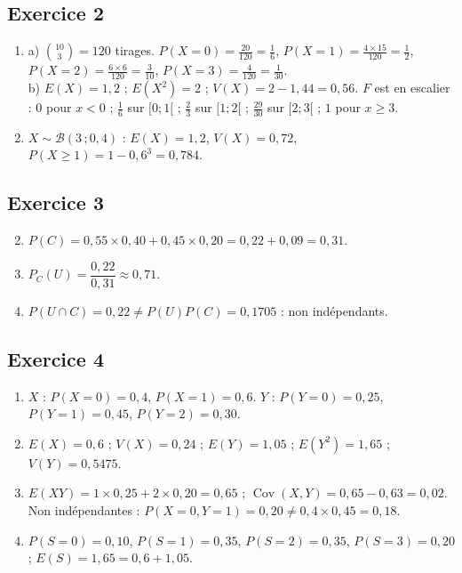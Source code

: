\documentclass[11pt,a4paper]{article}
\begin{document}
\subsection*{Exercice 2}
\begin{enumerate}
  \item a) $\binom{10}{3} = 120$ tirages.
  $P(X=0) = \frac{20}{120} = \frac16$, $P(X=1) = \frac{4\times15}{120} = \frac12$,
  $P(X=2) = \frac{6\times6}{120} = \frac{3}{10}$, $P(X=3) = \frac{4}{120} = \frac1{30}$.\\
  b) $E(X) = 1{,}2$ ; $E(X^2) = 2$ ; $V(X) = 2 - 1{,}44 = 0{,}56$.
  $F$ est en escalier : $0$ pour $x<0$ ; $\frac16$ sur $[0;1[$ ; $\frac23$ sur $[1;2[$ ; $\frac{29}{30}$ sur $[2;3[$ ; $1$ pour $x\geqslant3$.
  \item $X \sim \mathcal{B}(3\,;0{,}4)$ : $E(X) = 1{,}2$, $V(X) = 0{,}72$,
  $P(X\geqslant1) = 1 - 0{,}6^3 = 0{,}784$.
\end{enumerate}

\subsection*{Exercice 3}
\begin{enumerate}
  \setcounter{enumi}{1}
  \item $P(C) = 0{,}55\times0{,}40 + 0{,}45\times0{,}20 = 0{,}22 + 0{,}09 = 0{,}31$.
  \item $P_C(U) = \dfrac{0{,}22}{0{,}31} \approx 0{,}71$.
  \item $P(U\cap C) = 0{,}22 \neq P(U)P(C) = 0{,}1705$ : non indépendants.
\end{enumerate}

\subsection*{Exercice 4}
\begin{enumerate}
  \item $X$ : $P(X=0) = 0{,}4$, $P(X=1) = 0{,}6$. \quad
  $Y$ : $P(Y=0) = 0{,}25$, $P(Y=1) = 0{,}45$, $P(Y=2) = 0{,}30$.
  \item $E(X) = 0{,}6$ ; $V(X) = 0{,}24$ ; $E(Y) = 1{,}05$ ; $E(Y^2) = 1{,}65$ ; $V(Y) = 0{,}5475$.
  \item $E(XY) = 1\times0{,}25 + 2\times0{,}20 = 0{,}65$ ; $\operatorname{Cov}(X,Y) = 0{,}65 - 0{,}63 = 0{,}02$.
  Non indépendantes : $P(X=0,Y=1) = 0{,}20 \neq 0{,}4\times0{,}45 = 0{,}18$.
  \item $P(S=0) = 0{,}10$, $P(S=1) = 0{,}35$, $P(S=2) = 0{,}35$, $P(S=3) = 0{,}20$ ;
  $E(S) = 1{,}65 = 0{,}6 + 1{,}05$.
\end{enumerate}
\end{document}
